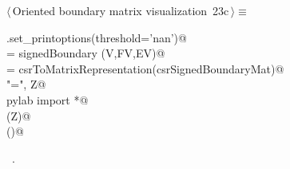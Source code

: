\documentclass[11pt,oneside]{article}	%
\begin{document}
\begin{flushleft} \small
\begin{minipage}{\linewidth} \label{scrap57}
\protect{}$\langle\,$Oriented boundary matrix visualization\nobreak\ {\footnotesize 23c}$\,\rangle\equiv$
\vspace{-1ex}
\begin{list}{}{} \item
\mbox{}\verb@np.set_printoptions(threshold='nan')@\\
\mbox{}\verb@csrSignedBoundaryMat = signedBoundary (V,FV,EV)@\\
\mbox{}\verb@Z = csrToMatrixRepresentation(csrSignedBoundaryMat)@\\
\mbox{}\verb@print "\ncsrSignedBoundaryMat =\n", Z@\\
\mbox{}\verb@from pylab import *@\\
\mbox{}\verb@matshow(Z)@\\
\mbox{}\verb@show()@\\
\mbox{}\verb@@{\NWsep}
\end{list}
\vspace{-1ex}
\footnotesize\addtolength{\baselineskip}{-1ex}
\begin{list}{}{\setlength{\itemsep}{-\parsep}\setlength{\itemindent}{-\leftmargin}}
\item \NWtxtMacroRefIn\ .
\end{list}
\end{minipage}\\[4ex]
\end{flushleft}
\end{document}
